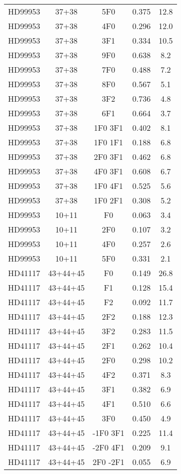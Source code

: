 \begin{table*}
\begin{tabular}{l c c c c}
HD99953 & 37+38 & 5F0 & 0.375 & 12.8\\ 
HD99953 & 37+38 & 4F0 & 0.296 & 12.0\\ 
HD99953 & 37+38 & 3F1 & 0.334 & 10.5\\ 
HD99953 & 37+38 & 9F0 & 0.638 & 8.2\\ 
HD99953 & 37+38 & 7F0 & 0.488 & 7.2\\ 
HD99953 & 37+38 & 8F0 & 0.567 & 5.1\\ 
HD99953 & 37+38 & 3F2 & 0.736 & 4.8\\ 
HD99953 & 37+38 & 6F1 & 0.664 & 3.7\\ 
HD99953 & 37+38 & 1F0 3F1 & 0.402 & 8.1\\ 
HD99953 & 37+38 & 1F0 1F1 & 0.188 & 6.8\\ 
HD99953 & 37+38 & 2F0 3F1 & 0.462 & 6.8\\ 
HD99953 & 37+38 & 4F0 3F1 & 0.608 & 6.7\\ 
HD99953 & 37+38 & 1F0 4F1 & 0.525 & 5.6\\ 
HD99953 & 37+38 & 1F0 2F1 & 0.308 & 5.2\\ 
\hline
HD99953 & 10+11 & F0 & 0.063 & 3.4\\ 
HD99953 & 10+11 & 2F0 & 0.107 & 3.2\\ 
HD99953 & 10+11 & 4F0 & 0.257 & 2.6\\ 
HD99953 & 10+11 & 5F0 & 0.331 & 2.1\\ 
\hline
HD41117 & 43+44+45 & F0 & 0.149 & 26.8\\ 
HD41117 & 43+44+45 & F1 & 0.128 & 15.4\\ 
HD41117 & 43+44+45 & F2 & 0.092 & 11.7\\ 
HD41117 & 43+44+45 & 2F2 & 0.188 & 12.3\\ 
HD41117 & 43+44+45 & 3F2 & 0.283 & 11.5\\ 
HD41117 & 43+44+45 & 2F1 & 0.262 & 10.4\\ 
HD41117 & 43+44+45 & 2F0 & 0.298 & 10.2\\ 
HD41117 & 43+44+45 & 4F2 & 0.371 & 8.3\\ 
HD41117 & 43+44+45 & 3F1 & 0.382 & 6.9\\ 
HD41117 & 43+44+45 & 4F1 & 0.510 & 6.6\\ 
HD41117 & 43+44+45 & 3F0 & 0.450 & 4.9\\ 
HD41117 & 43+44+45 & -1F0 3F1 & 0.225 & 11.4\\ 
HD41117 & 43+44+45 & -2F0 4F1 & 0.209 & 9.1\\ 
HD41117 & 43+44+45 & 2F0 -2F1 & 0.055 & 6.9\\ 

\end{tabular}
\end{table*}
